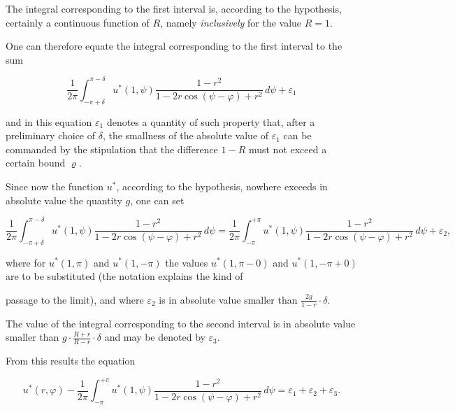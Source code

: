\documentclass{article}
\begin{document}
The integral corresponding to the first interval is, according to the hypothesis, certainly a continuous function of $R$, namely \emph{inclusively} for the value $R = 1$.



One can therefore equate the integral corresponding to the first interval to the sum

\[

\frac{1}{2\pi} \int_{-\pi+\delta}^{\pi-\delta} u^*(1, \psi) \frac{1 - r^2}{1 - 2r \cos(\psi - \varphi) + r^2}\,d\psi + \varepsilon_1

\]

and in this equation $\varepsilon_1$ denotes a quantity of such property that, after a preliminary choice of $\delta$, the smallness of the absolute value of $\varepsilon_1$ can be commanded by the stipulation that the difference $1 - R$ must not exceed a certain bound $\varrho$.



Since now the function $u^*$, according to the hypothesis, nowhere exceeds in absolute value the quantity $g$, one can set

\[

\frac{1}{2\pi} \int_{-\pi+\delta}^{\pi-\delta} u^*(1, \psi) \frac{1 - r^2}{1 - 2r \cos(\psi - \varphi) + r^2}\,d\psi = \frac{1}{2\pi} \int_{-\pi}^{+\pi} u^*(1, \psi) \frac{1 - r^2}{1 - 2r \cos(\psi - \varphi) + r^2}\,d\psi + \varepsilon_2,

\]

where for $u^*(1, \pi)$ and $u^*(1, -\pi)$ the values $u^*(1, \pi - 0)$ and $u^*(1, -\pi + 0)$ are to be substituted (the notation explains the kind of




passage to the limit), and where $\varepsilon_2$ is in absolute value smaller than $\frac{2g}{1 - r} \cdot \delta$.



The value of the integral corresponding to the second interval is in absolute value smaller than $g \cdot \frac{R + r}{R - r} \cdot \delta$ and may be denoted by $\varepsilon_3$.



From this results the equation

\[

u^*(r, \varphi) - \frac{1}{2\pi} \int_{-\pi}^{+\pi} u^*(1, \psi) \frac{1 - r^2}{1 - 2r \cos(\psi - \varphi) + r^2}\,d\psi = \varepsilon_1 + \varepsilon_2 + \varepsilon_3.

\]
\end{document}
